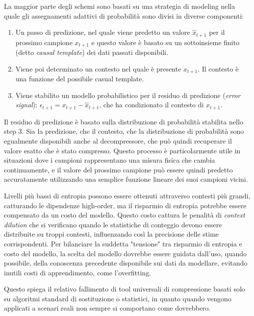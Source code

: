 La maggior parte degli schemi sono basati su una strategia di modeling nella quale gli assegnamenti adattivi di probabilità sono divisi in diverse componenti:
\begin{enumerate}
    \item Un passo di predizione, nel quale viene predetto un valore \(\hat{x}_{t+1}\) per il prossimo campione \(x_{t+1}\) e questo valore è basato su un sottoinsieme finito (detto \textit{causal template}) dei dati passati disponibili.
    \item Viene poi determinato un contesto nel quale è presente \(x_{t+1}\). Il contesto è una funzione del possibile casual template.
    \item Viene stabilito un modello probabilistico per il residuo di predizione (\textit{error signal}): \(\epsilon_{t+1} = x_{t+1} - \hat{x}_{t+1}\), che ha condizionato il contesto di \(x_{t+1}\).
\end{enumerate}

Il residuo di predizione è basato sulla distribuzione di probabilità stabilita nello step 3. Sia la predizione, che il contesto, che la distribuzione di probabilità sono egualmente disponibili anche al decompressore, che può quindi recuperare il valore esatto che è stato compresso. Questo processo è particolarmente utile in situazioni dove i campioni rappresentano una misura fisica che cambia continuamente, e il valore del prossimo campione può essere quindi predetto accuratamente utilizzando una semplice funzione lineare dei suoi campioni vicini. 

Livelli più bassi di entropia possono essere ottenuti attraverso contesti più grandi, catturando le dipendenze high-order, ma il risparmio di entropia potrebbe essere compensato da un costo del modello. Questo costo cattura le penalità di    \textit{context dilution} che si verificano quando le statistiche di conteggio devono essere distribuite su troppi contesti, influenzando così la precisione delle stime corrispondenti. Per bilanciare la suddetta "tensione" tra risparmio di entropia e costo del modello, la scelta del modello dovrebbe essere guidata dall'uso, quando possibile, della conoscenza precedente disponibile sui dati da modellare, evitando inutili costi di apprendimento, come l'overfitting.


Questo spiega il relativo fallimento di tool universali di compressione basati solo su algoritmi standard di sostituzione o statistici, in quanto quando vengono applicati a scenari reali non sempre si comportano come dovrebbero.


